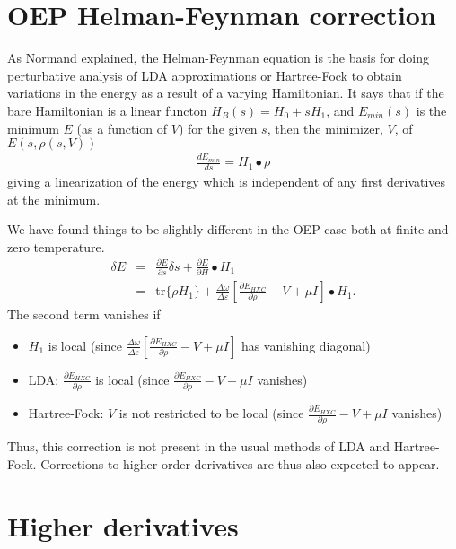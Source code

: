 \documentclass{article}
\newcommand{\beas}{\begin{eqnarray*}}
\newcommand{\enas}{\end{eqnarray*}}
\newcommand{\trace}{\mbox{tr}} \newcommand{\real}{\mathcal Re}
\newcommand{\Vscp}{V}
\begin{document}
\section{OEP Helman-Feynman correction}

As Normand explained, the Helman-Feynman equation is the basis for
doing perturbative analysis of LDA approximations or Hartree-Fock to
obtain variations in the energy as a result of a varying Hamiltonian.
It says that if the bare Hamiltonian is a linear functon
$H_B(s) = H_0 + s H_1$,
and $E_{min}(s)$ is the minimum $E$ (as a function of $\Vscp$) for the given $s$,
then the minimizer, $\Vscp$, of $E(s,\rho(s,\Vscp))$
\beas
\frac{d E_{min}}{d s} = H_1\bullet \rho
\enas
giving a linearization of the energy which is independent of
any first derivatives at the minimum.

We have found things to be slightly different in the OEP case
both at finite and zero temperature.
\beas
\delta E &=& \frac{\partial E}{\partial s} \delta s +
         \frac{\partial E}{\partial H} \bullet H_1\\
         &=& \trace\{\rho H_1\}
      +\frac{\Delta \omega}{\Delta \varepsilon}
      \left[ \frac{\partial E_{HXC}}{\partial \rho} - \Vscp + \mu I \right]
      \bullet H_1.
\enas
The second term vanishes if
\begin{itemize}
\item $H_1$ is local (since 
$\frac{\Delta \omega}{\Delta \varepsilon}
      \left[ \frac{\partial E_{HXC}}{\partial \rho} - \Vscp + \mu I \right]$
has vanishing diagonal)
\item LDA: $\frac{\partial E_{HXC}}{\partial \rho}$ is local
(since $\frac{\partial E_{HXC}}{\partial \rho} - \Vscp + \mu I$ vanishes)
\item Hartree-Fock: $\Vscp$ is not restricted to be local
(since $\frac{\partial E_{HXC}}{\partial \rho} - \Vscp + \mu I$ vanishes)
\end{itemize}
Thus, this correction is not present in the usual methods of
LDA and Hartree-Fock.  Corrections to higher order derivatives are
thus also expected to appear.

\section{Higher derivatives}
\end{document}
